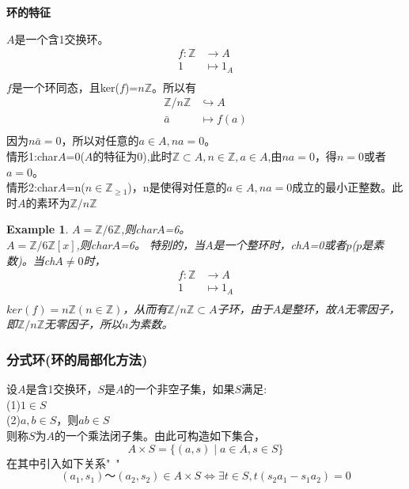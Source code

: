 \documentclass[UTF8]{article}
\newtheorem{exa}{Example}[section]
\begin{document}
\textbf{环的特征}

$A$是一个含1交换环。
\[
\begin{split}
f:\mathbb Z&\rightarrow A\\
1&\longmapsto 1_A\\
\end{split}
\]
$f$是一个环同态，且ker($f$)=$n\mathbb Z$。所以有
\[
\begin{split}
\mathbb Z/{n\mathbb Z}&\hookrightarrow A\\
\bar a&\longmapsto f(a)\\
\end{split}
\]
因为$n\bar a=0$，所以对任意的$a\in A,na=0$。\\
情形1:char$A$=0($A$的特征为0),此时$\mathbb Z\subset A,n\in\mathbb Z,a\in A$,由$na=0$，得$n=0$或者$a=0$。\\
情形2:char$A$=n($n\in\mathbb Z_{\ge1}$)，n是使得对任意的$a\in A,na=0$成立的最小正整数。此时$A$的素环为$\mathbb Z/{n\mathbb Z}$

\begin{exa}
	$A=\mathbb Z/{6\mathbb Z}$,则char$A$=6。\\
	$A=\mathbb Z/{6\mathbb Z}[x]$,则char$A$=6。
	特别的，当$A$是一个整环时，ch$A$=0或者$p$($p$是素数)。当ch$A\neq0$时，
	\[
	\begin{split}
	f:\mathbb Z&\rightarrow A\\
	1&\longmapsto 1_A\\
	\end{split}
	\]
	$ker(f)=n\mathbb Z(n\in\mathbb Z)$，从而有$\mathbb Z/{n\mathbb Z}\subset A$子环，由于$A$是整环，故$A$无零因子，即$\mathbb Z/{n\mathbb Z}$无零因子，所以$n$为素数。
\end{exa}

\subsubsection{分式环(环的局部化方法)}
设$A$是含1交换环，$S$是$A$的一个非空子集，如果$S$满足:\\
(1)$1\in S$\\
(2)$a,b\in S$，则$ab\in S$\\
则称$S$为$A$的一个乘法闭子集。由此可构造如下集合，$$A\times S=\{(a,s)\mid a\in A,s\in S\}$$
在其中引入如下关系"~"$$(a_1,s_1)～(a_2,s_2)\in A\times S\Leftrightarrow\exists t\in S,t(s_2a_1-s_1a_2)=0$$
\end{document}
